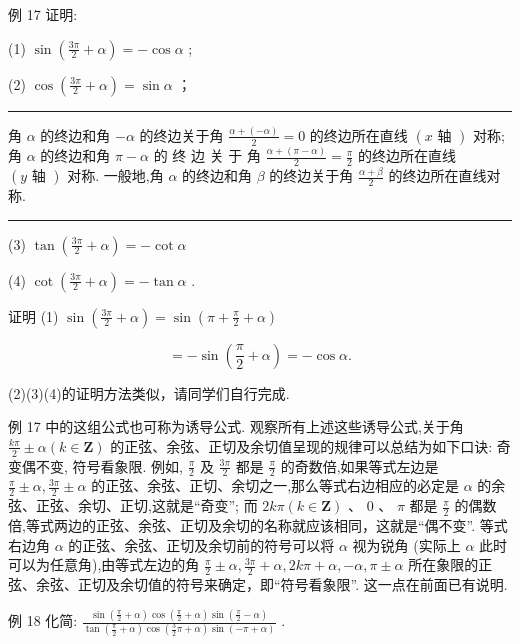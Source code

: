 \documentclass[10pt]{article}
\newcommand{\HRule}{\begin{center}\rule{0.9\linewidth}{0.2mm}\end{center}}
\begin{document}
例 17 证明:

(1) \(\sin \left( {\frac{3\pi }{2} + \alpha }\right)  =  - \cos \alpha\) ;

(2) \(\cos \left( {\frac{3\pi }{2} + \alpha }\right)  = \sin \alpha\) ；

\HRule

角 \(\alpha\) 的终边和角 \(- \alpha\) 的终边关于角 \(\frac{\alpha  + \left( {-\alpha }\right) }{2} = 0\) 的终边所在直线 \(\left( {x\text{ 轴 }}\right)\) 对称; 角 \(\alpha\) 的终边和角 \(\pi  - \alpha\) 的 终 边 关 于 角 \(\frac{\alpha  + \left( {\pi  - \alpha }\right) }{2} = \frac{\pi }{2}\) 的终边所在直线 \(\left( {y\text{ 轴 }}\right)\) 对称. 一般地,角 \(\alpha\) 的终边和角 \(\beta\) 的终边关于角 \(\frac{\alpha  + \beta }{2}\) 的终边所在直线对称.

\HRule

(3) \(\tan \left( {\frac{3\pi }{2} + \alpha }\right)  =  - \cot \alpha\)

(4) \(\cot \left( {\frac{3\pi }{2} + \alpha }\right)  =  - \tan \alpha\) .

证明 (1) \(\sin \left( {\frac{3\pi }{2} + \alpha }\right)  = \sin \left( {\pi  + \frac{\pi }{2} + \alpha }\right)\)

\[
=  - \sin \left( {\frac{\pi }{2} + \alpha }\right)  =  - \cos \alpha .
\]

(2)(3)(4)的证明方法类似，请同学们自行完成.

例 17 中的这组公式也可称为诱导公式. 观察所有上述这些诱导公式,关于角 \(\frac{k\pi }{2} \pm  \alpha \left( {k \in  \mathbf{Z}}\right)\) 的正弦、余弦、正切及余切值呈现的规律可以总结为如下口诀: 奇变偶不变, 符号看象限. 例如, \(\frac{\pi }{2}\) 及 \(\frac{3\pi }{2}\) 都是 \(\frac{\pi }{2}\) 的奇数倍,如果等式左边是 \(\frac{\pi }{2} \pm  \alpha ,\frac{3\pi }{2} \pm  \alpha\) 的正弦、余弦、正切、余切之一,那么等式右边相应的必定是 \(\alpha\) 的余弦、正弦、余切、正切,这就是“奇变”; 而 \({2k\pi }\left( {k \in  \mathbf{Z}}\right) \text{ 、 }0\text{ 、 }\pi\) 都是 \(\frac{\pi }{2}\) 的偶数倍,等式两边的正弦、余弦、正切及余切的名称就应该相同，这就是“偶不变”. 等式右边角 \(\alpha\) 的正弦、余弦、正切及余切前的符号可以将 \(\alpha\) 视为锐角 (实际上 \(\alpha\) 此时可以为任意角),由等式左边的角 \(\frac{\pi }{2} \pm  \alpha ,\frac{3\pi }{2} + \alpha ,{2k\pi } + \alpha , - \alpha ,\pi  \pm  \alpha\) 所在象限的正弦、余弦、正切及余切值的符号来确定，即“符号看象限”. 这一点在前面已有说明.

例 18 化简: \(\frac{\sin \left( {\frac{\pi }{2} + \alpha }\right) \cos \left( {\frac{\pi }{2} + \alpha }\right) \sin \left( {\frac{\pi }{2} - \alpha }\right) }{\tan \left( {\frac{\pi }{2} + \alpha }\right) \cos \left( {\frac{3}{2}\pi  + \alpha }\right) \sin \left( {-\pi  + \alpha }\right) }\) .
\end{document}
